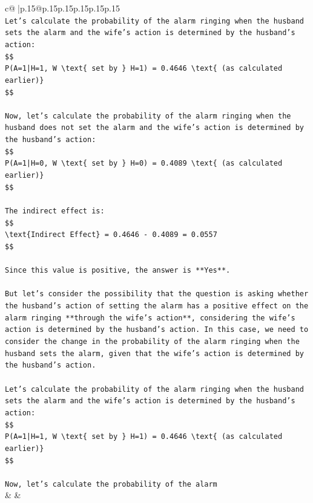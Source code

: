\documentclass{article}
\begin{document}
{\begin{supertabular}{c@{$\;$}|p{.15\linewidth}@{}p{.15\linewidth}p{.15\linewidth}p{.15\linewidth}p{.15\linewidth}p{.15\linewidth}}
{{{\\ 
\texttt{Let's calculate the probability of the alarm ringing when the husband sets the alarm and the wife's action is determined by the husband's action:} \\
\texttt{\$\$} \\
\texttt{P(A=1|H=1, W \textbackslash{}text\{ set by \} H=1) = 0.4646 \textbackslash{}text\{ (as calculated earlier)\}} \\
\texttt{\$\$} \\
\\ 
\texttt{Now, let's calculate the probability of the alarm ringing when the husband does not set the alarm and the wife's action is determined by the husband's action:} \\
\texttt{\$\$} \\
\texttt{P(A=1|H=0, W \textbackslash{}text\{ set by \} H=0) = 0.4089 \textbackslash{}text\{ (as calculated earlier)\}} \\
\texttt{\$\$} \\
\\ 
\texttt{The indirect effect is:} \\
\texttt{\$\$} \\
\texttt{\textbackslash{}text\{Indirect Effect\} = 0.4646 {-} 0.4089 = 0.0557} \\
\texttt{\$\$} \\
\\ 
\texttt{Since this value is positive, the answer is **Yes**.} \\
\\ 
\texttt{But let's consider the possibility that the question is asking whether the husband's action of setting the alarm has a positive effect on the alarm ringing **through the wife's action**, considering the wife's action is determined by the husband's action. In this case, we need to consider the change in the probability of the alarm ringing when the husband sets the alarm, given that the wife's action is determined by the husband's action.} \\
\\ 
\texttt{Let's calculate the probability of the alarm ringing when the husband sets the alarm and the wife's action is determined by the husband's action:} \\
\texttt{\$\$} \\
\texttt{P(A=1|H=1, W \textbackslash{}text\{ set by \} H=1) = 0.4646 \textbackslash{}text\{ (as calculated earlier)\}} \\
\texttt{\$\$} \\
\\ 
\texttt{Now, let's calculate the probability of the alarm} \\
            }
        }
    }
    & & \\ \\


\end{supertabular}}
\end{document}
